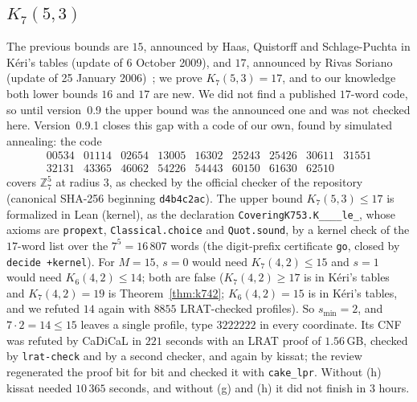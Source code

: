 \documentclass[11pt]{amsart}
\theoremstyle{definition}
\theoremstyle{remark}
\begin{document}
\subsection*{$K_7(5,3)$}
The previous bounds are $15$, announced by Haas, Quistorff and Schlage-Puchta in Kéri's tables (update of 6 October 2009), and $17$, announced by Rivas Soriano (update of 25 January 2006)~\cite{keri}; we prove $K_7(5,3)=17$, and to our knowledge both lower bounds $16$ and $17$ are new. We did not find a published $17$-word code, so until version~0.9 the upper bound was the announced one and was not checked here.
Version~0.9.1 closes this gap with a code of our own, found by simulated annealing: the code
\[
\begin{array}{ccccccccc}
00534 & 01114 & 02654 & 13005 & 16302 & 25243 & 25426 & 30611 & 31551\\
32131 & 43365 & 46062 & 54226 & 54443 & 60150 & 61630 & 62510 &
\end{array}
\]
covers $\mathbb{Z}_7^5$ at radius $3$, as checked by the official checker of the repository (canonical SHA-256 beginning \texttt{d4b4c2ac}).
The upper bound $K_7(5,3)\le 17$ is formalized in Lean (kernel), as the declaration \texttt{CoveringK753.\allowbreak K\_\_\_\_\allowbreak le\_}, whose axioms are \texttt{propext}, \texttt{Classical.choice} and \texttt{Quot.sound}, by a kernel check of the $17$-word list over the $7^5=16\,807$ words (the digit-prefix certificate \texttt{go}, closed by \texttt{decide +kernel}).
For $M=15$, $s=0$ would need $K_7(4,2)\le 15$ and $s=1$ would need $K_6(4,2)\le 14$; both are false ($K_7(4,2)\ge 17$ is in Kéri's tables and $K_7(4,2)=19$ is Theorem~\ref{thm:k742}; $K_6(4,2)=15$ is in Kéri's tables, and we refuted $14$ again with $8855$ LRAT-checked profiles). So $s_{\min}=2$, and $7\cdot 2=14\le 15$ leaves a single profile, type $3222222$ in every coordinate.
Its CNF was refuted by CaDiCaL in $221$ seconds with an LRAT proof of $1.56$\,GB, checked by \texttt{lrat-check} and by a second checker, and again by kissat; the review regenerated the proof bit for bit and checked it with \texttt{cake\_lpr}.
Without (h) kissat needed $10\,365$ seconds, and without (g) and (h) it did not finish in $3$ hours.
\end{document}
